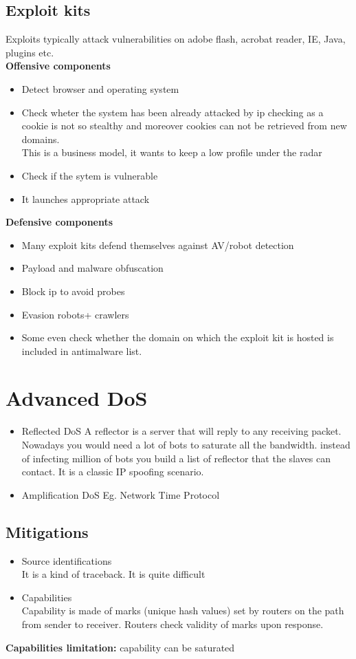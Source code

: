 \documentclass[10pt,a4paper]{book}
\begin{document}
\section{Exploit kits}
Exploits typically attack vulnerabilities on adobe flash, acrobat reader, IE, Java, plugins etc.\\
\textbf{Offensive components}
\begin{itemize}
\item Detect browser and operating system
\item Check wheter the system has been already attacked by ip checking as a cookie is not so stealthy and moreover cookies can not be retrieved from new domains.\\ This is a business model, it wants to keep a low profile under the radar
\item Check if the sytem is vulnerable
\item It launches appropriate attack
\end{itemize}
\textbf{Defensive components}
\begin{itemize}
\item Many exploit kits defend themselves against AV/robot detection
\item Payload and malware obfuscation
\item Block ip to avoid probes
\item Evasion robots+ crawlers
\item Some even check whether the domain on which the exploit kit is hosted is included in antimalware list.
\end{itemize}
\chapter{Advanced DoS}
\begin{itemize}
\item Reflected DoS A reflector is a server that will reply to any receiving packet. Nowadays you would need a lot of bots to saturate all the bandwidth. instead of infecting million of bots you build a list of reflector that the slaves can contact. It is a classic IP spoofing scenario.
\item Amplification DoS
Eg. Network Time Protocol
\end{itemize}
\section{Mitigations}
\begin{itemize}
\item Source identifications\\
It is a kind of traceback. It is quite difficult
\item Capabilities\\
Capability is made of marks (unique hash values) set by routers on the path from sender to receiver. Routers check validity of marks upon response.
\end{itemize}
\textbf{Capabilities limitation:} capability can be saturated
\end{document}
